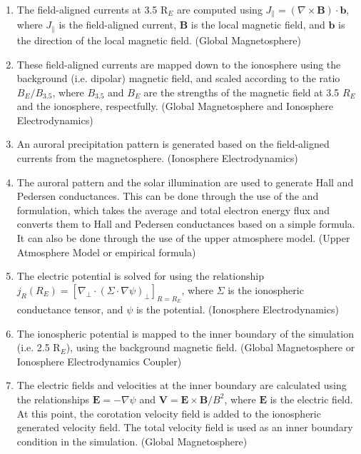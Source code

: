 \begin{enumerate}

\item
The field-aligned currents at 3.5 R$_E$ are computed using
$J_{\parallel} = ({\nabla}{\times}{\mathbf{B}}){\cdot}{\mathbf{b}}$,
where $J_{\parallel}$ is the field-aligned current, $\mathbf{B}$ is
the local magnetic field, and $\mathbf{b}$ is the direction of the
local magnetic field. (Global Magnetosphere)

\item
These field-aligned currents are mapped down to the ionosphere using
the background (i.e. dipolar) magnetic field, and scaled according to
the ratio $B_{E}/B_{3.5}$, where $B_{3.5}$ and $B_{E}$ are the
strengths of the magnetic field at 3.5 $R_E$ and the ionosphere,
respectfully. (Global Magnetosphere and Ionosphere Electrodynamics)

\item
An auroral precipitation pattern is generated based on the
field-aligned currents from the magnetosphere. (Ionosphere
Electrodynamics)

\item
The auroral pattern and the solar illumination are used to generate
Hall and Pedersen conductances.  This can be done through the use of
the \cite{robinson87} and \cite{moen93} formulation, which takes the
average and total electron energy flux and converts them to Hall and
Pedersen conductances based on a simple formula.  It can also be done
through the use of the upper atmosphere model. (Upper Atmosphere
Model or empirical formula)

\item
The electric potential is solved for using the relationship $j_R(R_E)
=[{\nabla}_{\perp}{\cdot}({\Sigma}{\cdot}{\nabla}{\psi})_{\perp}]_{R=R_E}$,
where $\Sigma$ is the ionospheric conductance tensor, and $\psi$ is
the potential. (Ionosphere Electrodynamics)

\item
The ionospheric potential is mapped to the inner boundary of the
simulation (i.e. 2.5 R$_E$), using the background magnetic field.
(Global Magnetosphere or Ionosphere Electrodynamics Coupler)

\item
The electric fields and velocities at the inner boundary are
calculated using the relationships $\mathbf{E}=-{\nabla}{\psi}$ and
$\mathbf{V}=\mathbf{E}{\times}\mathbf{B}/B^2$, where $\mathbf{E}$ is
the electric field.  At this point, the corotation velocity field is
added to the ionospheric generated velocity field.  The total velocity
field is used as an inner boundary condition in the simulation.
(Global Magnetosphere)

\end{enumerate}

